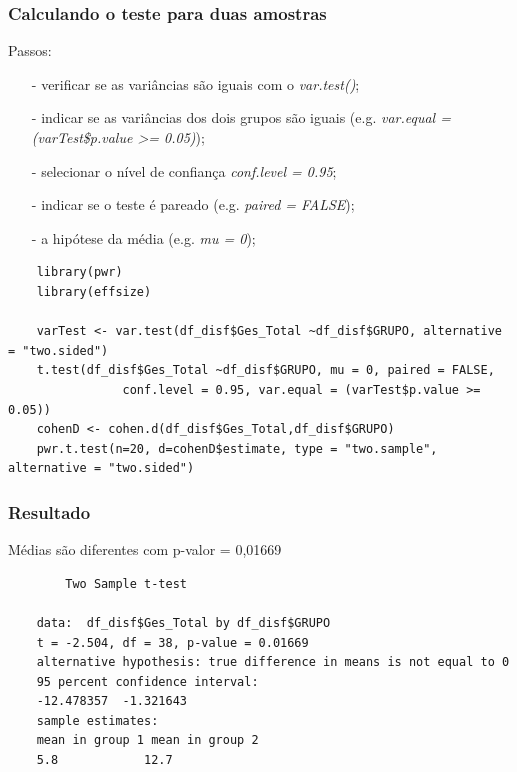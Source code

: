 \documentclass[graphics,14pt]{beamer}
\begin{document}
\begin{frame}[t,fragile=singleslide]
\frametitle{Calculando o teste para duas amostras}

	Passos: 
	\begin{itemize}
		\item[-] verificar se as variâncias são iguais com o \textit{var.test()};
		\item[-] indicar se as variâncias dos dois grupos são iguais (e.g. \textit{var.equal = (varTest\$p.value >= 0.05)});
		\item[-] selecionar o nível de confiança \textit{conf.level = 0.95};
		\item[-] indicar se o teste é pareado (e.g. \textit{paired = FALSE});
		\item[-] a hipótese da média (e.g. \textit{mu = 0});
	\end{itemize}

	\begin{lstlisting}
	library(pwr)
	library(effsize)
	
	varTest <- var.test(df_disf$Ges_Total ~df_disf$GRUPO, alternative = "two.sided")
	t.test(df_disf$Ges_Total ~df_disf$GRUPO, mu = 0, paired = FALSE, 
				conf.level = 0.95, var.equal = (varTest$p.value >= 0.05))
	cohenD <- cohen.d(df_disf$Ges_Total,df_disf$GRUPO)
	pwr.t.test(n=20, d=cohenD$estimate, type = "two.sample", alternative = "two.sided")
	\end{lstlisting}
\end{frame}
\begin{frame}[t,fragile=singleslide]
\frametitle{Resultado}
	
	Médias são diferentes com p-valor = 0,01669
	
	\vspace{1cm}
	
	\begin{lstlisting}
		Two Sample t-test
	
	data:  df_disf$Ges_Total by df_disf$GRUPO
	t = -2.504, df = 38, p-value = 0.01669
	alternative hypothesis: true difference in means is not equal to 0
	95 percent confidence interval:
	-12.478357  -1.321643
	sample estimates:
	mean in group 1 mean in group 2 
	5.8            12.7 
	\end{lstlisting}
	
	
\end{frame}
\end{document}
